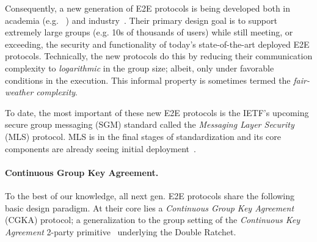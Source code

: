 Consequently, a new generation of E2E protocols is being developed both in
academia (e.g.~%
\cite{CCS:CCGMM18,EC:AlwCorDod19,TCC:ACJM20,EPRINT:AlwJosMul20,C:ACDT20,TCC:AABNKPPW21,SP:ACC+21,hashimoto2021cmpke})
and industry~\cite{MLS}. Their primary design goal is to support extremely
large groups (e.g. 10s of thousands of users) while still meeting, or
exceeding, the security and functionality of today's state-of-the-art
deployed E2E protocols. Technically, the new protocols do this by reducing
their communication complexity to \emph{logarithmic} in the group size;
albeit, only under favorable conditions in the execution. This informal
property is sometimes termed the \emph{fair-weather complexity}. %

To date, the most important of these new E2E protocols is the IETF's upcoming
secure group messaging (SGM) standard called the \emph{Messaging Layer
Security} (MLS) protocol.
MLS is in the final stages of standardization and its core
components are already seeing initial deployment~\cite{Cisco-Webex-MLS}.

\paragraph{Continuous Group Key Agreement.}
To the best of our knowledge, all next gen. E2E protocols share the following
basic design paradigm. At their core lies a \emph{Continuous Group Key
Agreement} (CGKA) protocol; a generalization to the group setting of the
\emph{Continuous Key Agreement} 2-party
primitive~\cite{EC:AlwCorDod19,CSCML:DG19} underlying the Double Ratchet.

